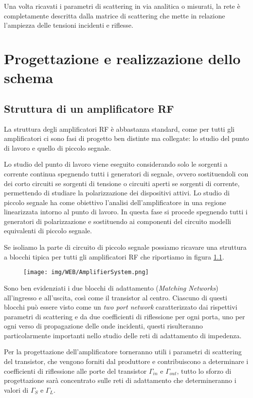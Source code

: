 \documentclass[12pt,oneside]{book}
\begin{document}
Una volta ricavati i parametri di scattering in via analitica o misurati, la rete è completamente descritta dalla matrice di scattering che mette in relazione l'ampiezza delle tensioni incidenti e riflesse.



\chapter{Progettazione e realizzazione dello schema}
\section{Struttura di un amplificatore RF}
La struttura degli amplificatori RF è abbastanza standard, come per tutti gli amplificatori ci sono fasi di progetto ben distinte ma collegate: lo studio del punto di lavoro e quello di piccolo segnale.

Lo studio del punto di lavoro viene eseguito considerando solo le sorgenti a corrente continua spegnendo tutti i generatori di segnale, ovvero sostituendoli con dei corto circuiti se sorgenti  di tensione o circuiti aperti se sorgenti di corrente, permettendo di studiare la polarizzazione dei dispositivi attivi.
Lo studio di piccolo segnale ha come obiettivo l'analisi dell'amplificatore in una regione linearizzata intorno al punto di lavoro. In questa fase si procede spegnendo tutti i generatori di polarizzazione e sostituendo ai componenti del circuito modelli equivalenti di piccolo segnale.

Se isoliamo la parte di circuito di piccolo segnale possiamo ricavare una struttura a blocchi tipica per tutti gli amplificatori RF che riportiamo in figura \ref{amp_sist}.

\begin{figure}[!htbp]
    \centering
    \texttt{[image: img/WEB/AmplifierSystem.png]}
    \caption{}
    \label{amp_sist}
\end{figure}
Sono ben evidenziati i due blocchi di adattamento (\textit{Matching Networks}) all'ingresso e all'uscita, così come il transistor al centro. Ciascuno di questi blocchi può essere visto come un \textit{two port network} caratterizzato dai rispettivi parametri di scattering e da due coefficienti di riflessione per ogni porta, uno per ogni verso di propagazione delle onde incidenti, questi risulteranno particolarmente importanti nello studio delle reti di adattamento di impedenza.

Per la progettazione dell'amplificatore torneranno utili i parametri di scattering del transistor, che vengono forniti dal produttore e contribuiscono a determinare i coefficienti di riflessione alle porte del transistor $\Gamma_{in}$ e $\Gamma_{out}$, tutto lo sforzo di progettazione sarà concentrato sulle reti di adattamento che determineranno i valori di $\Gamma_{S}$ e $\Gamma_{L}$.
\end{document}
